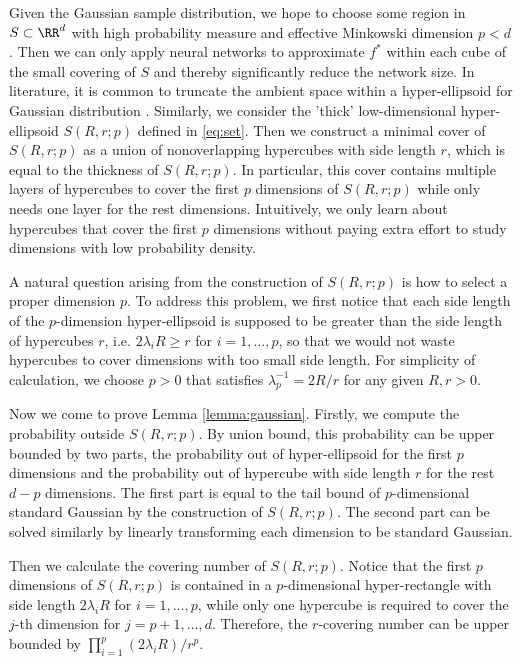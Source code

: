 Given the Gaussian sample distribution, we hope to choose some region in $S \subset \RR^d$ with high probability measure and effective Minkowski dimension $p<d$. Then we can only apply neural networks to approximate $f^*$ within each cube of the small covering of $S$ and thereby significantly reduce the network size.
In literature, it is common to truncate the ambient space within a hyper-ellipsoid for Gaussian distribution \citep{ellis2007multivariate,pakman2014exact}. Similarly, we consider the 'thick' low-dimensional hyper-ellipsoid $S(R,r;p)$ defined in \eqref{eq:set}. 
Then we construct a minimal cover of $S(R,r;p)$ as a union of nonoverlapping hypercubes with side length $r$, which is equal to the thickness of $S(R,r;p)$. In particular, this cover contains multiple layers of hypercubes to cover the first $p$ dimensions of $S(R,r;p)$ while only needs one layer for the rest dimensions. Intuitively, we only learn about hypercubes that cover the first $p$ dimensions without paying extra effort to study dimensions with low probability density. 


A natural question arising from the construction of $S(R,r;p)$ is how to select a proper dimension $p$. To address this problem, we first notice that each side length of the $p$-dimension hyper-ellipsoid is supposed to be greater than the side length of hypercubes $r$, i.e. $2\lambda_i R \geq r$ for $i=1,\ldots,p$, so that we would not waste hypercubes to cover dimensions with too small side length. For simplicity of calculation, we choose $p>0$ that satisfies $\lambda_p^{-1} = 2R/r$ for any given $R,r>0$.  

Now we come to prove Lemma \ref{lemma:gaussian}. Firstly, we compute the probability outside $S(R,r;p)$. By union bound, this probability can be upper bounded by two parts, the probability out of hyper-ellipsoid for the first $p$ dimensions and the probability out of hypercube with side length $r$ for the rest $d-p$ dimensions. The first part is equal to the tail bound of $p$-dimensional standard Gaussian by the construction of $S(R,r;p)$. The second part can be solved similarly by linearly transforming each dimension to be standard Gaussian.

Then we calculate the covering number of $S(R,r;p)$. Notice that the first $p$ dimensions of $S(R,r;p)$ is contained in a $p$-dimensional hyper-rectangle with side length $2\lambda_i R$ for $i=1,\ldots,p$, while only one hypercube is required to cover the $j$-th dimension for $j=p+1,\ldots,d$. Therefore, the $r$-covering number can be upper bounded by $\prod_{i=1}^p (2\lambda_i R)/r^p$.
